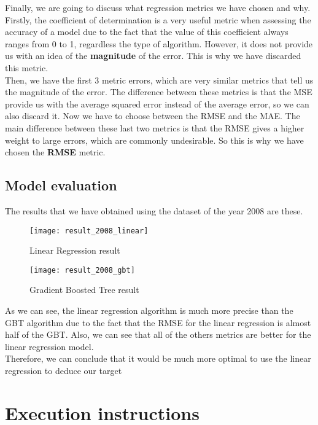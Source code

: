 Finally, we are going to discuss what regression metrics we have chosen and why.\\

Firstly, the coefficient of determination is a very useful metric when assessing the accuracy of a model due to the fact that the value of this coefficient always ranges from 0 to 1, regardless the type of algorithm. However, it does not provide us with an idea of the \textbf{magnitude} of the error. This is why we have discarded this metric.\\

Then, we have the first 3 metric errors, which are very similar metrics that tell us the magnitude of the error. The difference between these metrics is that the MSE provide us with the average squared error instead of the average error, so we can also discard it. Now we have to choose between the RMSE and the MAE. The main difference between these last two metrics is that the RMSE gives a higher weight to large errors, which are commonly undesirable. So this is why we have chosen the \textbf{RMSE} metric.

\subsection{Model evaluation}

The results that we have obtained using the dataset of the year 2008 are these.

\begin{figure}[H]
	\centering
	\texttt{[image: result\_2008\_linear]}
	\caption{Linear Regression result}
\end{figure}

\begin{figure}[H]
	\centering
	\texttt{[image: result\_2008\_gbt]}
	\caption{Gradient Boosted Tree result}
\end{figure}

As we can see, the linear regression algorithm is much more precise than the GBT algorithm due to the fact that the RMSE for the linear regression is almost half of the GBT. Also, we can see that all of the others metrics are better for the linear regression model.\\

Therefore, we can conclude that it would be much more optimal to use the linear regression to deduce our target

\section{Execution instructions}

